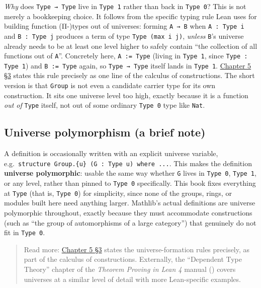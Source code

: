 \emph{Why} does \texttt{Type → Type} live in \texttt{Type 1} rather than back in \texttt{Type 0}? This is not merely a bookkeeping choice. It follows from the specific typing rule Lean uses for building function (Π-)types out of universes: forming \texttt{A → B} when \texttt{A : Type i} and \texttt{B : Type j} produces a term of type \texttt{Type (max i j)}, \emph{unless} \texttt{B}'s universe already needs to be at least one level higher to safely contain ``the collection of all functions out of \texttt{A}''. Concretely here, \texttt{A := Type} (living in \texttt{Type 1}, since \texttt{Type : Type 1}) and \texttt{B := Type} again, so \texttt{Type → Type} itself lands in \texttt{Type 1}. \hyperref[sec:05-rigor-check:03-typing-rules-and-safety:1]{Chapter 5 §3} states this rule precisely as one line of the calculus of constructions. The short version is that \texttt{Group} is not even a candidate carrier type for its own construction. It sits one universe level too high, exactly because it is a function \emph{out of} \texttt{Type} itself, not out of some ordinary \texttt{Type 0} type like \texttt{Nat}.

\subsection{Universe polymorphism (a brief note)}\label{sec:05-rigor-check:02-universes:4}

A definition is occasionally written with an explicit universe variable, e.g.~\texttt{structure Group.\{u\} (G : Type u) where ...}. This makes the definition \textbf{universe polymorphic}: usable the same way whether \texttt{G} lives in \texttt{Type 0}, \texttt{Type 1}, or any level, rather than pinned to \texttt{Type 0} specifically. This book fixes everything at \texttt{Type} (that is, \texttt{Type 0}) for simplicity, since none of the groups, rings, or modules built here need anything larger. Mathlib's actual definitions are universe polymorphic throughout, exactly because they must accommodate constructions (such as ``the group of automorphisms of a large category'') that genuinely do not fit in \texttt{Type 0}.

\begin{quote}
Read more: \hyperref[sec:05-rigor-check:03-typing-rules-and-safety:1]{Chapter 5 §3} states the universe-formation rules precisely, as part of the calculus of constructions. Externally, the ``Dependent Type Theory'' chapter of the \emph{Theorem Proving in Lean 4} manual (\cite{TPIL4}) covers universes at a similar level of detail with more Lean-specific examples.
\end{quote}

